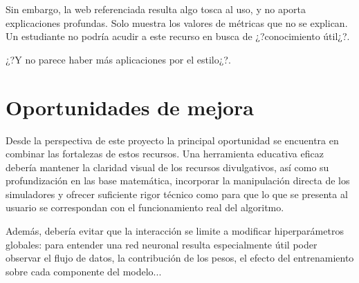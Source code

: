 Sin embargo, la web referenciada resulta algo tosca al uso, y no aporta explicaciones profundas.
Solo muestra los valores de métricas que no se explican.
Un estudiante no podría acudir a este recurso en busca de ¿?conocimiento útil¿?.

¿?Y no parece haber más aplicaciones por el estilo¿?.



\section{Oportunidades de mejora}
\label{sec:sota_comparacion}


Desde la perspectiva de este proyecto la principal oportunidad se encuentra en combinar las fortalezas de estos recursos.
Una herramienta educativa eficaz debería mantener la claridad visual de los recursos divulgativos, así como su profundización en las base matemática, incorporar la manipulación directa de los simuladores y ofrecer suficiente rigor técnico como para que lo que se presenta al usuario se correspondan con el funcionamiento real del algoritmo.

Además, debería evitar que la interacción se limite a modificar hiperparámetros globales: para entender una red neuronal resulta especialmente útil poder observar el flujo de datos, la contribución de los pesos, el efecto del entrenamiento sobre cada componente del modelo...


